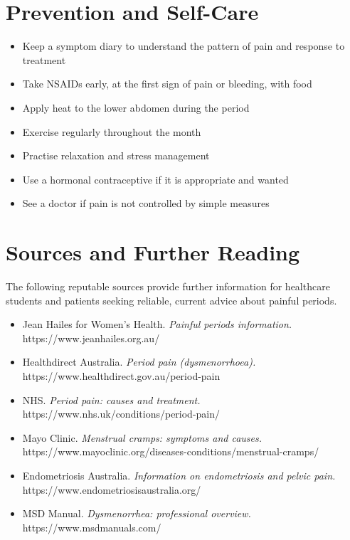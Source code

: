 \section*{Prevention and Self-Care}
\begin{itemize}
    \item Keep a symptom diary to understand the pattern of pain and response to treatment
    \item Take NSAIDs early, at the first sign of pain or bleeding, with food
    \item Apply heat to the lower abdomen during the period
    \item Exercise regularly throughout the month
    \item Practise relaxation and stress management
    \item Use a hormonal contraceptive if it is appropriate and wanted
    \item See a doctor if pain is not controlled by simple measures
\end{itemize}

\section*{Sources and Further Reading}
The following reputable sources provide further information for healthcare students and patients seeking reliable, current advice about painful periods.
\begin{itemize}
    \item Jean Hailes for Women's Health. \textit{Painful periods information.} https://www.jeanhailes.org.au/
    \item Healthdirect Australia. \textit{Period pain (dysmenorrhoea).} https://www.healthdirect.gov.au/period-pain
    \item NHS. \textit{Period pain: causes and treatment.} https://www.nhs.uk/conditions/period-pain/
    \item Mayo Clinic. \textit{Menstrual cramps: symptoms and causes.} https://www.mayoclinic.org/diseases-conditions/menstrual-cramps/
    \item Endometriosis Australia. \textit{Information on endometriosis and pelvic pain.} https://www.endometriosisaustralia.org/
    \item MSD Manual. \textit{Dysmenorrhea: professional overview.} https://www.msdmanuals.com/
\end{itemize}
